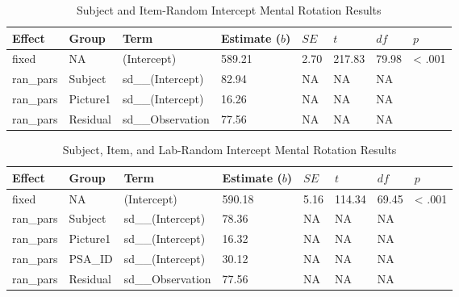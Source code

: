 \documentclass[
  man,mask,floatsintext]{apa7}
\begin{document}
\begin{table}[tbp]

\begin{center}
\begin{threeparttable}

\caption{\label{tab:item_e}Subject and Item-Random Intercept Mental Rotation Results}

\begin{tabular}{llllllll}
\toprule
Effect & Group & Term & Estimate ($b$) & $SE$ & $t$ & $df$ & $p$\\
\midrule
fixed & NA & (Intercept) & 589.21 & 2.70 & 217.83 & 79.98 & < .001\\
ran\_pars & Subject & sd\_\_(Intercept) & 82.94 & NA & NA & NA & \\
ran\_pars & Picture1 & sd\_\_(Intercept) & 16.26 & NA & NA & NA & \\
ran\_pars & Residual & sd\_\_Observation & 77.56 & NA & NA & NA & \\
\bottomrule
\end{tabular}

\end{threeparttable}
\end{center}

\end{table}

\begin{table}[tbp]

\begin{center}
\begin{threeparttable}

\caption{\label{tab:lab_e}Subject, Item, and Lab-Random Intercept Mental Rotation Results}

\begin{tabular}{llllllll}
\toprule
Effect & Group & Term & Estimate ($b$) & $SE$ & $t$ & $df$ & $p$\\
\midrule
fixed & NA & (Intercept) & 590.18 & 5.16 & 114.34 & 69.45 & < .001\\
ran\_pars & Subject & sd\_\_(Intercept) & 78.36 & NA & NA & NA & \\
ran\_pars & Picture1 & sd\_\_(Intercept) & 16.32 & NA & NA & NA & \\
ran\_pars & PSA\_ID & sd\_\_(Intercept) & 30.12 & NA & NA & NA & \\
ran\_pars & Residual & sd\_\_Observation & 77.56 & NA & NA & NA & \\
\bottomrule
\end{tabular}

\end{threeparttable}
\end{center}

\end{table}
\end{document}
